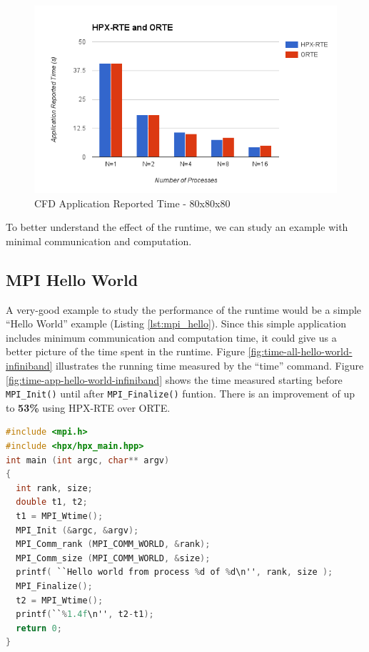 \begin{figure}[h]
  \centering
  \includegraphics[scale=0.7]{images/time-app-heatsolver-80-infiniband.png}
  \caption[CFD Application Reported Time - 80x80x80]{CFD Application Reported Time - 80x80x80}
  \label{fig:time-app-heatsolver-80-infiniband}
\end{figure}

To better understand the effect of the runtime, we can study an example with minimal communication and computation. 

\clearpage
\subsection{MPI Hello World}
A very-good example to study the performance of the runtime would be a simple ``Hello World'' example (Listing \ref{lst:mpi_hello}). Since this simple application includes minimum communication and computation time, it could give us a better picture of the time spent in the runtime. Figure \ref{fig:time-all-hello-world-infiniband} illustrates the running time measured by the ``time'' command. Figure \ref{fig:time-app-hello-world-infiniband} shows the time measured starting before \verb|MPI_Init()| until after \verb|MPI_Finalize()| funtion. There is an improvement of up to \textbf{53\%} using HPX-RTE over ORTE.

\begin{lstlisting}[language=C, frame=single, basicstyle=\footnotesize, caption=MPI Hello World \label{lst:mpi_hello}]
#include <mpi.h>
#include <hpx/hpx_main.hpp>
int main (int argc, char** argv)
{
  int rank, size;
  double t1, t2;
  t1 = MPI_Wtime();
  MPI_Init (&argc, &argv);
  MPI_Comm_rank (MPI_COMM_WORLD, &rank);
  MPI_Comm_size (MPI_COMM_WORLD, &size);
  printf( ``Hello world from process %d of %d\n'', rank, size );
  MPI_Finalize();
  t2 = MPI_Wtime();
  printf(``%1.4f\n'', t2-t1);
  return 0;
}
\end{lstlisting}

